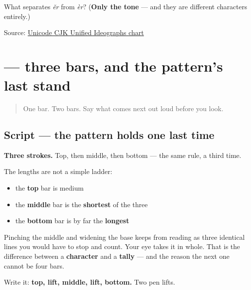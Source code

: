 \begin{tcolorbox}[breakable,colback=teal!4,colframe=teal!35!black,title={Before you move on}]
What separates \emph{ěr} from \emph{èr}? (\textbf{Only the tone} — and they are different characters entirely.)

Source: \href{https://www.unicode.org/charts/PDF/U4E00.pdf}{Unicode CJK Unified Ideographs chart}
\end{tcolorbox}
\section[\texorpdfstring{\zh{三} (sān)}{三 (sān)}]{ — three bars, and the pattern's last stand}

\label{lesson:ZH-W03-san}



\begin{quote}
One bar. Two bars. Say what comes next out loud before you look.
\end{quote}

\subsection*{Script — the pattern holds one last time}

\begin{quote}
\end{quote}

\textbf{Three strokes.} Top, then middle, then bottom — the same rule, a third time.

The lengths are not a simple ladder:

\begin{itemize}
\raggedright
  \item the \textbf{top} bar is medium
  \item the \textbf{middle} bar is the \textbf{shortest} of the three
  \item the \textbf{bottom} bar is by far the \textbf{longest}
\end{itemize}

Pinching the middle and widening the base keeps  from reading as three identical lines you would have to stop and count. Your eye takes it in whole. That is the difference between a \textbf{character} and a \textbf{tally} — and the reason the next one cannot be four bars.

Write it: \textbf{top, lift, middle, lift, bottom.} Two pen lifts.

